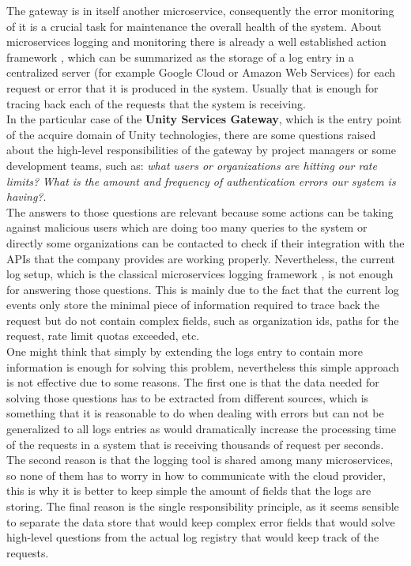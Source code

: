 \documentclass[12pt]{article}
\begin{document}
The gateway is in itself another microservice, consequently the error monitoring of it is a crucial task for maintenance the overall health of the system. About microservices logging and monitoring there is already a well established action framework \cite{MicroservicesBestPractices}, which can be summarized as the storage of a log entry in a centralized server (for example Google Cloud or Amazon Web Services) for each request or error that it is produced in the system. Usually that is enough for tracing back each of the requests that the system is receiving.\\

In the particular case of the \textbf{Unity Services Gateway}, which is the entry point of the acquire domain of Unity technologies, there are some questions raised about the high-level responsibilities of the gateway by project managers or some development teams, such as: \textit{what users or organizations are hitting our rate limits?} \textit{What is the amount and frequency of authentication errors our system is having?}.\\

The answers to those questions are relevant because some actions can be taking against malicious users which are doing too many queries to the system or directly some organizations can be contacted to check if their integration with the APIs that the company provides are working properly. Nevertheless, the current log setup, which is the classical microservices logging framework \cite{MicroservicesBestPractices}, is not enough for answering those questions. This is mainly due to the fact that the current log events only store the minimal piece of information required to trace back the request but do not contain complex fields, such as organization ids, paths for the request, rate limit quotas exceeded, etc.\\

One might think that simply by extending the logs entry to contain more information is enough for solving this problem, nevertheless this simple approach is not effective due to some reasons. The first one is that the data needed for solving those questions has to be extracted from different sources, which is something that it is reasonable to do when dealing with errors but can not be generalized to all logs entries as would dramatically increase the processing time of the requests in a system that is receiving thousands of request per seconds. The second reason is that the logging tool is shared among many microservices, so none of them has to worry in how to communicate with the cloud provider, this is why it is better to keep simple the amount of fields that the logs are storing. The final reason is the single responsibility principle, as it seems sensible to separate the data store that would keep complex error fields that would solve high-level questions from the actual log registry that would keep track of the requests.\\
\end{document}
